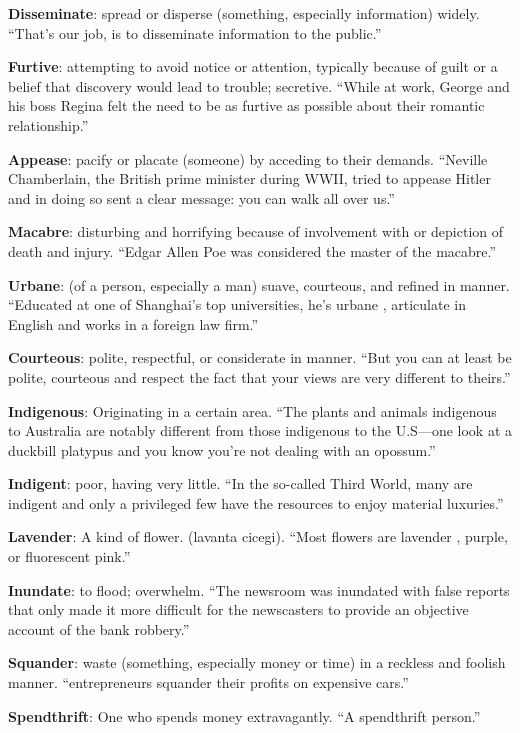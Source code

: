 \documentclass[12pt, a4paper]{ximera}
\begin{document}
\textbf{Disseminate}: spread or disperse (something, especially information) widely. ``That's our job, is to disseminate information to the public.''

\textbf{Furtive}: attempting to avoid notice or attention, typically because of guilt or a belief that discovery would lead to trouble; secretive. ``While at work, George and his boss Regina felt the need to be as furtive as possible about their romantic relationship.''

\textbf{Appease}: pacify or placate (someone) by acceding to their demands. ``Neville Chamberlain, the British prime minister during WWII, tried to appease Hitler and in doing so sent a clear message: you can walk all over us.''

\textbf{Macabre}: disturbing and horrifying because of involvement with or depiction of death and injury. ``Edgar Allen Poe was considered the master of the macabre.''

\textbf{Urbane}: (of a person, especially a man) suave, courteous, and refined in manner. ``Educated at one of Shanghai's top universities, he's urbane , articulate in English and works in a foreign law firm.''

\textbf{Courteous}: polite, respectful, or considerate in manner. ``But you can at least be polite, courteous and respect the fact that your views are very different to theirs.''

\textbf{Indigenous}: Originating in a certain area. ``The plants and animals indigenous to Australia are notably different from those indigenous to the U.S—one look at a duckbill platypus and you know you’re not dealing with an opossum.''

\textbf{Indigent}: poor, having very little. ``In the so-called Third World, many are indigent and only a privileged few have the resources to enjoy material luxuries.''

\textbf{Lavender}: A kind of flower. (lavanta cicegi). ``Most flowers are lavender , purple, or fluorescent pink.''

\textbf{Inundate}: to flood; overwhelm. ``The newsroom was inundated with false reports that only made it more difficult for the newscasters to provide an objective account of the bank robbery.''

\textbf{Squander}: waste (something, especially money or time) in a reckless and foolish manner. ``entrepreneurs squander their profits on expensive cars.''

\textbf{Spendthrift}: One who spends money extravagantly. ``A spendthrift person.''
\end{document}
